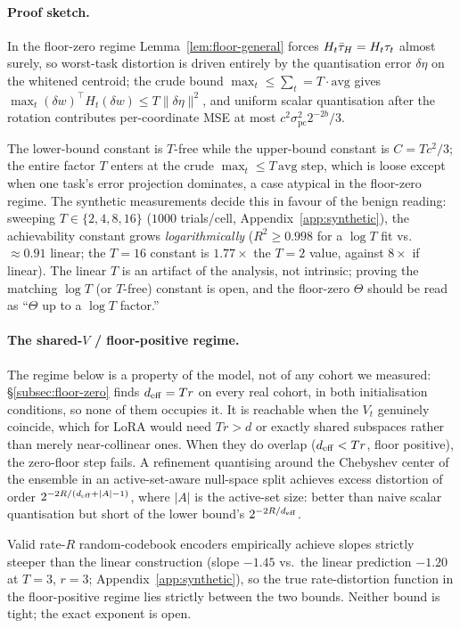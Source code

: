 \paragraph{Proof sketch.} In the floor-zero regime
Lemma~\ref{lem:floor-general} forces $H_t\bar{\tau}_H = H_t\tau_t$ almost
surely, so worst-task distortion is driven entirely by the quantisation
error $\delta\eta$ on the whitened centroid; the crude bound
$\max_t \leq \sum_t = T\cdot\mathrm{avg}$ gives
$\max_t(\delta w)^\top H_t(\delta w) \leq T\|\delta\eta\|^2$, and
uniform scalar quantisation after the rotation contributes
per-coordinate MSE at most $c^2\sigma_{\mathrm{pc}}^2 2^{-2b}/3$.

\begin{remark}
\label{rem:tgap}
The lower-bound constant is $T$-free while the upper-bound constant is
$C = Tc^2/3$; the entire factor $T$ enters at the crude
$\max_t \leq T\,\mathrm{avg}$ step, which is loose except when one
task's error projection dominates, a case atypical in the floor-zero
regime. The synthetic measurements decide this in favour of the benign
reading: sweeping $T \in \{2,4,8,16\}$ ($1000$ trials/cell,
Appendix~\ref{app:synthetic}), the achievability constant grows
\emph{logarithmically} ($R^2 \geq 0.998$ for a $\log T$ fit vs.\
$\approx 0.91$ linear; the $T{=}16$ constant is $1.77\times$ the
$T{=}2$ value, against $8\times$ if linear). The linear $T$ is an
artifact of the analysis, not intrinsic; proving the matching $\log T$
(or $T$-free) constant is open, and the floor-zero $\Theta$ should be
read as ``$\Theta$ up to a $\log T$ factor.''
\end{remark}

\paragraph{The shared-$V$ / floor-positive regime.}\label{subsec:sharedv}
The regime below is a property of the model, not of any cohort we
measured: \S\ref{subsec:floor-zero} finds $d_{\mathrm{eff}} = Tr$ on every real
cohort, in both initialisation conditions, so none of them occupies it.
It is reachable when the $V_t$ genuinely coincide, which for LoRA would
need $Tr > d$ or exactly shared subspaces rather than merely
near-collinear ones. When they do overlap ($d_{\mathrm{eff}} < Tr$, floor positive),
the zero-floor step fails. A refinement quantising around the Chebyshev center of the
ensemble in an active-set-aware null-space split achieves excess
distortion of order $2^{-2R/(d_{\mathrm{eff}} + |A| - 1)}$, where $|A|$ is the
active-set size: better than naive scalar quantisation but short of
the lower bound's $2^{-2R/d_{\mathrm{eff}}}$.

\begin{remark}\label{rem:sharedv-gap}
Valid rate-$R$ random-codebook encoders empirically achieve slopes
strictly steeper than the linear construction (slope $-1.45$ vs.\ the
linear prediction $-1.20$ at $T = 3$, $r = 3$;
Appendix~\ref{app:synthetic}), so the true rate-distortion function in
the floor-positive regime lies strictly between the two bounds. Neither
bound is tight; the exact exponent is open.
\end{remark}
